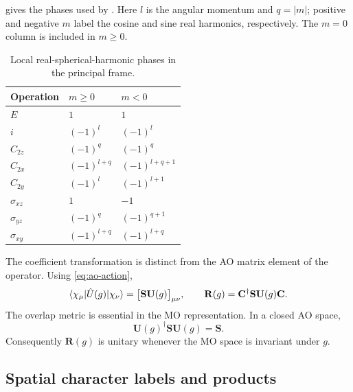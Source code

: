 \documentclass[aip,jcp,preprint,nobibnotes,nofootinbib]{revtex4-1}
\newcommand{\bvec}[1]{\mathbf{#1}}
\newcommand{\code}[1]{\texttt{\detokenize{#1}}}
\begin{document}
 gives the phases used by \code{local_sign}. Here $l$ is the
angular momentum and $q=|m|$; positive and negative $m$ label the cosine and
sine real harmonics, respectively. The $m=0$ column is included in $m\geq0$.
\begin{table}[ht]
\setlength{\tabcolsep}{10pt}
\caption{Local real-spherical-harmonic phases in the principal frame.}
\label{tab:phases}
\begin{tabular}{@{}lll@{}}
\hline
Operation & $m\geq0$ & $m<0$ \\
\hline
$E$ & $1$ & $1$ \\
$i$ & $(-1)^l$ & $(-1)^l$ \\
$C_{2z}$ & $(-1)^q$ & $(-1)^q$ \\
$C_{2x}$ & $(-1)^{l+q}$ & $(-1)^{l+q+1}$ \\
$C_{2y}$ & $(-1)^l$ & $(-1)^{l+1}$ \\
$\sigma_{xz}$ & $1$ & $-1$ \\
$\sigma_{yz}$ & $(-1)^q$ & $(-1)^{q+1}$ \\
$\sigma_{xy}$ & $(-1)^{l+q}$ & $(-1)^{l+q}$ \\
\hline
\end{tabular}
\end{table}

The coefficient transformation is distinct from the AO matrix element of the
operator. Using \cref{eq:ao-action},
\begin{equation}
 \braket{\chi_\mu|\hat U(g)|\chi_\nu}
   =\bigl[\bvec{S}\bvec{U}(g)\bigr]_{\mu\nu},\qquad
 \bvec{R}(g)=\bvec{C}^\dagger\bvec{S}\bvec{U}(g)\bvec{C}.
 \label{eq:mo-rep}
\end{equation}
The overlap metric is essential in the MO representation. In a closed AO
space,
\begin{equation}
 \bvec{U}(g)^\dagger\bvec{S}\bvec{U}(g)=\bvec{S}.
 \label{eq:metric-invariance}
\end{equation}
Consequently $\bvec{R}(g)$ is unitary whenever the MO space is invariant under
$g$.

\subsection{Spatial character labels and products}
\end{document}
